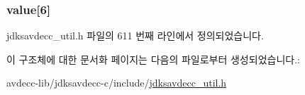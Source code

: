 \subsubsection[{\texorpdfstring{value}{value}}]{ value\mbox{[}6\mbox{]}}\hypertarget{structjdksavdecc__eui48_a18b93f04637cf37688ec10a33a0cbc26}{}\label{structjdksavdecc__eui48_a18b93f04637cf37688ec10a33a0cbc26}


jdksavdecc\+\_\+util.\+h 파일의 611 번째 라인에서 정의되었습니다.



이 구조체에 대한 문서화 페이지는 다음의 파일로부터 생성되었습니다.\+:\begin{DoxyCompactItemize}
\item 
avdecc-\/lib/jdksavdecc-\/c/include/\hyperlink{jdksavdecc__util_8h}{jdksavdecc\+\_\+util.\+h}\end{DoxyCompactItemize}
